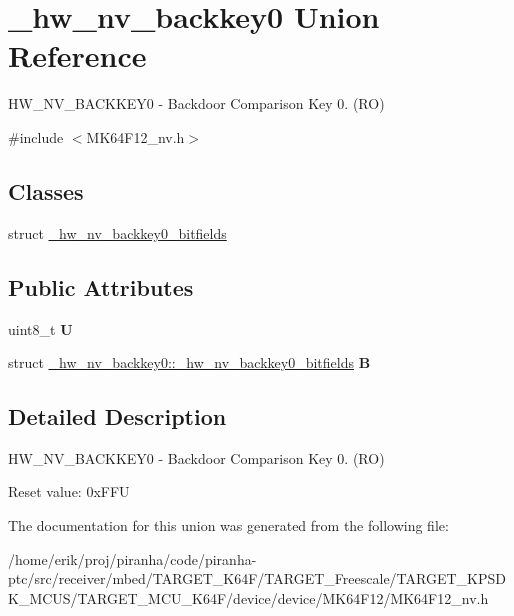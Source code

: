 \hypertarget{union__hw__nv__backkey0}{}\section{\+\_\+hw\+\_\+nv\+\_\+backkey0 Union Reference}
\label{union__hw__nv__backkey0}


H\+W\+\_\+\+N\+V\+\_\+\+B\+A\+C\+K\+K\+E\+Y0 -\/ Backdoor Comparison Key 0. (RO)  




{\ttfamily \#include $<$M\+K64\+F12\+\_\+nv.\+h$>$}

\subsection*{Classes}
\begin{DoxyCompactItemize}
\item 
struct \hyperlink{struct__hw__nv__backkey0_1_1__hw__nv__backkey0__bitfields}{\+\_\+hw\+\_\+nv\+\_\+backkey0\+\_\+bitfields}
\end{DoxyCompactItemize}
\subsection*{Public Attributes}
\begin{DoxyCompactItemize}
\item 
uint8\+\_\+t {\bfseries U}\hypertarget{union__hw__nv__backkey0_a38acde20e3e93d02f188b1fb6122d9f2}{}\label{union__hw__nv__backkey0_a38acde20e3e93d02f188b1fb6122d9f2}

\item 
struct \hyperlink{struct__hw__nv__backkey0_1_1__hw__nv__backkey0__bitfields}{\+\_\+hw\+\_\+nv\+\_\+backkey0\+::\+\_\+hw\+\_\+nv\+\_\+backkey0\+\_\+bitfields} {\bfseries B}\hypertarget{union__hw__nv__backkey0_ab273e65356d03ad57f32dc51d3aa79b7}{}\label{union__hw__nv__backkey0_ab273e65356d03ad57f32dc51d3aa79b7}

\end{DoxyCompactItemize}


\subsection{Detailed Description}
H\+W\+\_\+\+N\+V\+\_\+\+B\+A\+C\+K\+K\+E\+Y0 -\/ Backdoor Comparison Key 0. (RO) 

Reset value\+: 0x\+F\+FU 

The documentation for this union was generated from the following file\+:\begin{DoxyCompactItemize}
\item 
/home/erik/proj/piranha/code/piranha-\/ptc/src/receiver/mbed/\+T\+A\+R\+G\+E\+T\+\_\+\+K64\+F/\+T\+A\+R\+G\+E\+T\+\_\+\+Freescale/\+T\+A\+R\+G\+E\+T\+\_\+\+K\+P\+S\+D\+K\+\_\+\+M\+C\+U\+S/\+T\+A\+R\+G\+E\+T\+\_\+\+M\+C\+U\+\_\+\+K64\+F/device/device/\+M\+K64\+F12/M\+K64\+F12\+\_\+nv.\+h\end{DoxyCompactItemize}
